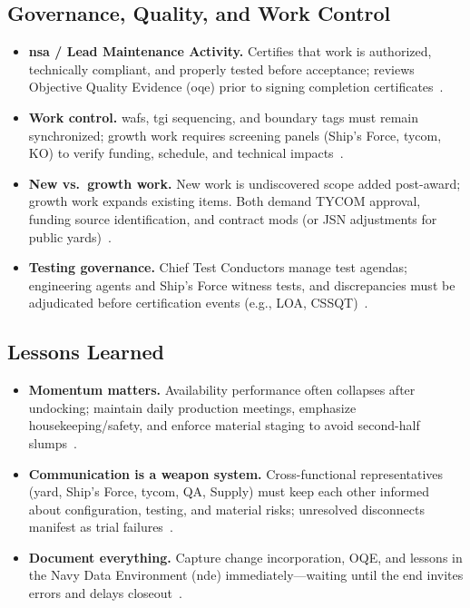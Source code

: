 \documentclass[../main.tex]{subfiles}
\begin{document}
\subsection{Governance, Quality, and Work Control}
\begin{itemize}
\item \textbf{\ac{nsa} / Lead Maintenance Activity.} Certifies that work is authorized, technically compliant, and properly tested before acceptance; reviews Objective Quality Evidence (\ac{oqe}) prior to signing completion certificates~\autocite{COMFLTFORCOMINST4790-3}.
\item \textbf{Work control.} \acp{waf}, \ac{tgi} sequencing, and boundary tags must remain synchronized; growth work requires screening panels (Ship's Force, \ac{tycom}, KO) to verify funding, schedule, and technical impacts~\autocite{edo-4-2-2-cno-availability-execution-2025}.
\item \textbf{New vs.\ growth work.} New work is undiscovered scope added post-award; growth work expands existing items. Both demand TYCOM approval, funding source identification, and contract mods (or JSN adjustments for public yards)~\autocite{COMFLTFORCOMINST4790-3}.
\item \textbf{Testing governance.} Chief Test Conductors manage test agendas; engineering agents and Ship's Force witness tests, and discrepancies must be adjudicated before certification events (e.g., LOA, CSSQT)~\autocite{edo-4-2-2-cno-availability-execution-2025}.
\end{itemize}

\subsection{Lessons Learned}
\begin{itemize}
\item \textbf{Momentum matters.} Availability performance often collapses after undocking; maintain daily production meetings, emphasize housekeeping/safety, and enforce material staging to avoid second-half slumps~\autocite{edo-4-2-2-cno-availability-execution-2025}.
\item \textbf{Communication is a weapon system.} Cross-functional representatives (yard, Ship's Force, \ac{tycom}, QA, Supply) must keep each other informed about configuration, testing, and material risks; unresolved disconnects manifest as trial failures~\autocite{edo-4-2-2-cno-availability-execution-2025}.
\item \textbf{Document everything.} Capture change incorporation, OQE, and lessons in the Navy Data Environment (\ac{nde}) immediately—waiting until the end invites errors and delays closeout~\autocite{COMFLTFORCOMINST4790-3}.
\end{itemize}

\end{document}
